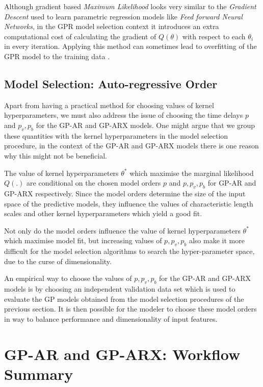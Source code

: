 \documentclass{article}
\begin{document}
Although gradient based \emph{Maximum Likelihood} looks very similar
to the \emph{Gradient Descent} used to learn parametric regression
models like \emph{Feed forward Neural Networks}, in the GPR model
selection context it introduces an extra computational cost of
calculating the gradient of $Q(\theta)$ with respect to each
$\theta_i$ in every iteration. Applying this method can sometimes lead
to overfitting of the GPR model to the training data \citep{Rasmussen:2005:GPM:1162254}.

\subsection{Model Selection: Auto-regressive Order}

Apart from having a practical method for choosing values of kernel
hyperparameters, we must also address the issue of choosing the time
delays $p$ and $p_v, p_b$ for the GP-AR and GP-ARX models. One might
argue that we group these quantities with the kernel hyperparameters
in the model selection procedure, in the context of the GP-AR and
GP-ARX models there is one reason why this might not be beneficial. 

The value of kernel hyperparameters $\theta^*$ which maximise the
marginal likelihood $Q(.)$ are conditional on the chosen model orders
$p$ and $p, p_v, p_b$ for GP-AR and GP-ARX respectively. Since the
model orders determine the size of the input space of the predictive
models, they influence the values of characteristic length scales and
other kernel hyperparameters which yield a good fit.

Not only do the model orders influence the value of kernel
hyperparameters $\theta^*$ which maximise model fit, but increasing
values of $p, p_v, p_b$ also make it more difficult for the model
selection algorithms to search the hyper-parameter space, due to the
curse of dimensionality.

An empirical way to choose the values of $p, p_v, p_b$ for the GP-AR
and GP-ARX models is by choosing an independent validation data set
which is used to evaluate the GP models obtained from the model
selection procedures of the previous section. It is then possible for
the modeler to choose these model orders in way to balance performance
and dimensionality of input features.

\section{GP-AR and GP-ARX: Workflow Summary}\label{sec:workflow}
\end{document}
